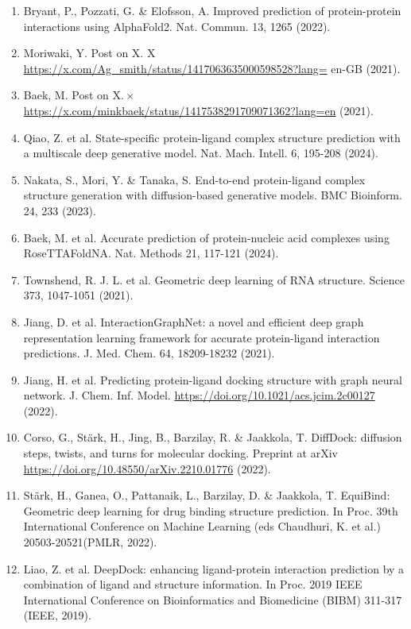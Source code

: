 \documentclass[10pt]{article}
\begin{document}
\begin{enumerate}
  \item Bryant, P., Pozzati, G. \& Elofsson, A. Improved prediction of protein-protein interactions using AlphaFold2. Nat. Commun. 13, 1265 (2022).
  \item Moriwaki, Y. Post on X. X \href{https://x.com/Ag_smith/status/1417063635000598528?lang=}{https://x.com/Ag\_smith/status/1417063635000598528?lang=} en-GB (2021).
  \item Baek, M. Post on $\mathrm{X} . \times$ \href{https://x.com/minkbaek/status/1417538291709071362?lang=en}{https://x.com/minkbaek/status/1417538291709071362?lang=en} (2021).
  \item Qiao, Z. et al. State-specific protein-ligand complex structure prediction with a multiscale deep generative model. Nat. Mach. Intell. 6, 195-208 (2024).
  \item Nakata, S., Mori, Y. \& Tanaka, S. End-to-end protein-ligand complex structure generation with diffusion-based generative models. BMC Bioinform. 24, 233 (2023).
  \item Baek, M. et al. Accurate prediction of protein-nucleic acid complexes using RoseTTAFoldNA. Nat. Methods 21, 117-121 (2024).
  \item Townshend, R. J. L. et al. Geometric deep learning of RNA structure. Science 373, 1047-1051 (2021).
  \item Jiang, D. et al. InteractionGraphNet: a novel and efficient deep graph representation learning framework for accurate protein-ligand interaction predictions. J. Med. Chem. 64, 18209-18232 (2021).
  \item Jiang, H. et al. Predicting protein-ligand docking structure with graph neural network. J. Chem. Inf. Model. \href{https://doi.org/10.1021/acs.jcim.2c00127}{https://doi.org/10.1021/acs.jcim.2c00127} (2022).
  \item Corso, G., Stärk, H., Jing, B., Barzilay, R. \& Jaakkola, T. DiffDock: diffusion steps, twists, and turns for molecular docking. Preprint at arXiv \href{https://doi.org/10.48550/arXiv.2210.01776}{https://doi.org/10.48550/arXiv.2210.01776} (2022).
  \item Stärk, H., Ganea, O., Pattanaik, L., Barzilay, D. \& Jaakkola, T. EquiBind: Geometric deep learning for drug binding structure prediction. In Proc. 39th International Conference on Machine Learning (eds Chaudhuri, K. et al.) 20503-20521(PMLR, 2022).
  \item Liao, Z. et al. DeepDock: enhancing ligand-protein interaction prediction by a combination of ligand and structure information. In Proc. 2019 IEEE International Conference on Bioinformatics and Biomedicine (BIBM) 311-317 (IEEE, 2019).

\end{enumerate}
\end{document}
